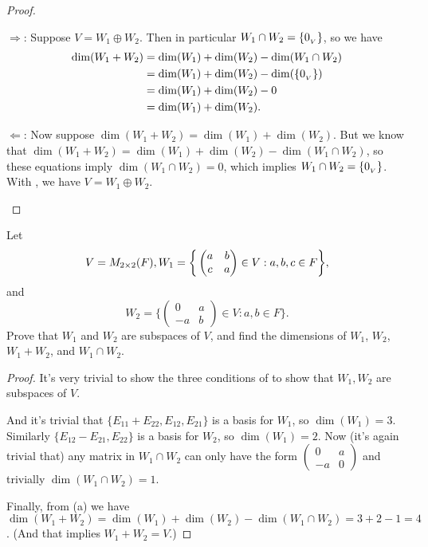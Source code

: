 \begin{proof}
\begin{enumerate}
\(\Longrightarrow\):
Suppose \(V = W_1 \oplus W_2\).
Then in particular \(W_1 \cap W_2 = \{ 0_{_V} \}\), so we have
\begin{align*}
    \dim(W_1 + W_2) & = \dim(W_1) + \dim(W_2) - \dim(W_1 \cap W_2) \\
                    & = \dim(W_1) + \dim(W_2) - \dim(\{ 0_{_V} \}) \\
                    & = \dim(W_1) + \dim(W_2) - 0 \\
                    & = \dim(W_1) + \dim(W_2).
\end{align*}

\(\Longleftarrow\):
Now suppose \(\dim(W_1 + W_2) = \dim(W_1) + \dim(W_2)\).
But we know that \(\dim(W_1 + W_2) = \dim(W_1) + \dim(W_2) - \dim(W_1 \cap W_2)\), so these equations imply \(\dim(W_1 \cap W_2) = 0\), which implies \(W_1 \cap W_2 = \{ 0_{_V} \}\).
With , we have \(V = W_1 \oplus W_2\).
\end{enumerate}
\end{proof}

\begin{exercise} \label{exercise 1.6.30}
Let
\[
    V = M_{2 \times 2}(F),
    W_1 = \bigg\{
        \begin{pmatrix}
            a & b \\
            c & a
        \end{pmatrix}
        \in V: a, b, c \in F
        \bigg\},
\]
and
\[
    W_2 = \bigg\{
        \begin{pmatrix}
            0 & a \\
            -a & b
        \end{pmatrix}
        \in V: a, b \in F
        \bigg\}.
\]
Prove that \(W_1\) and \(W_2\) are subspaces of \(V\), and find the dimensions of \(W_1\), \(W_2\), \(W_1 + W_2\), and \(W_1 \cap W_2\).
\end{exercise}

\begin{proof}
It's very trivial to show the three conditions of  to show that \(W_1, W_2\) are subspaces of \(V\).

And it's trivial that \(\{ E_{11} + E_{22}, E_{12}, E_{21} \}\) is a basis for \(W_1\), so \(\dim(W_1) = 3\).
Similarly \(\{ E_{12} - E_{21}, E_{22} \}\) is a basis for \(W_2\), so \(\dim(W_1) = 2\).
Now (it's again trivial that) any matrix in \(W_1 \cap W_2\) can only have the form
\(\begin{pmatrix}
    0 & a \\
    -a & 0
\end{pmatrix}\)
and trivially \(\dim(W_1 \cap W_2) = 1\).

Finally, from (a) we have \(\dim(W_1 + W_2) = \dim(W_1) + \dim(W_2) - \dim(W_1 \cap W_2) = 3 + 2 - 1 = 4\).
(And that implies \(W_1 + W_2 = V\).)
\end{proof}

